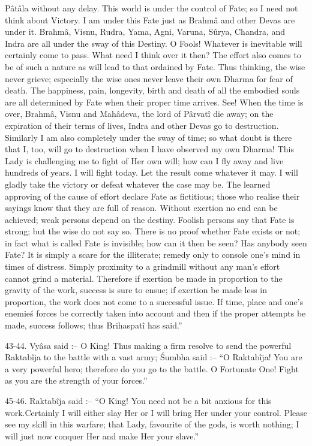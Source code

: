 P\^at\^ala without any delay. This world is under the control of Fate; so I need not think about Victory. I am under this Fate just as Brahm\^a and other Devas are under it. Brahm\^a, Visnu, Rudra, Yama, Agni, Varuna, S\^urya, Chandra, and Indra are all under the sway of this Destiny. O Fools! Whatever is inevitable will certainly come to pass. What need I think over it then? The effort also comes to be of such a nature as will lead to that ordained by Fate. Thus thinking, the wise never grieve; especially the wise ones never leave their own Dharma for fear of death. The happiness, pain, longevity, birth and death of all the embodied souls are all determined by Fate when their proper time arrives. See! When the time is over, Brahm\^a, Visnu and Mah\^adeva, the lord of P\^arvat\^i die away; on the expiration of their terms of lives, Indra and other Devas go to destruction. Similarly I am also completely under the sway of time; so what doubt is there that I, too, will go to destruction when I have observed my own Dharma! This Lady is challenging me to fight of Her own will; how can I fly away and live hundreds of years. I will fight today. Let the result come whatever it may. I will gladly take the victory or defeat whatever the case may be. The learned approving of the cause of effort declare Fate as fictitious; those who realise their sayings know that they are full of reason. Without exertion no end can be achieved; weak persons depend on the destiny. Foolish persons say that Fate is strong; but the wise do not say so. There is no proof whether Fate exists or not; in fact what is called Fate is invisible; how can it then be seen? Has anybody seen Fate? It is simply a scare for the illiterate; remedy only to console one's mind in times of distress. Simply proximity to a grindmill without any man's effort cannot grind a material. Therefore if exertion be made in proportion to the gravity of the work, success is sure to ensue; if exertion be made less in proportion, the work does not come to a successful issue. If time, place and one's enemie\'s forces be correctly taken into account and then if the proper attempts be made, success follows; thus Brihaspat\^i has said.''

43-44. Vy\^asa said :-- O King! Thus making a firm resolve to send the powerful Raktab\^ija to the battle with a vast army; \'Sumbha said :-- ``O Raktab\^ija! You are a very powerful hero; therefore do you go to the battle. O Fortunate One! Fight as you are the strength of your forces.''

45-46. Raktab\^ija said :-- ``O King! You need not be a bit anxious for this work.Certainly I will either slay Her or I will bring Her under your control. Please see my skill in this warfare; that Lady, favourite of the gods, is worth nothing; I will just now conquer Her and make Her your slave.''

